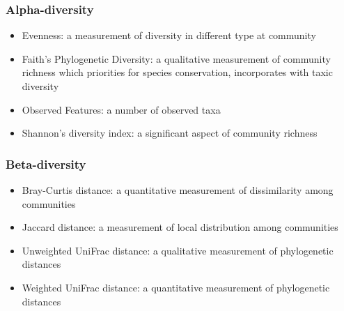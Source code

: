 \documentclass{beamer}
\begin{document}
    \begin{frame}
        \frametitle{Alpha-diversity}

        \begin{itemize}
            \item Evenness: a measurement of diversity in different type at community \cite{evenness1}
            \item Faith's Phylogenetic Diversity: a qualitative measurement of community richness which priorities for species conservation, incorporates with taxic diversity \cite{faith1}
            \item Observed Features: a number of observed taxa
            \item Shannon's diversity index: a significant aspect of community richness \cite{shannon1}
        \end{itemize}
    \end{frame}

    \begin{frame}
        \frametitle{Beta-diversity}

        \begin{itemize}
            \item Bray-Curtis distance: a quantitative measurement of dissimilarity among communities \cite{bray1}
            \item Jaccard distance: a measurement of local distribution among communities \cite{jaccard1}
            \item Unweighted UniFrac distance: a qualitative measurement of phylogenetic distances \cite{unifrac1}
            \item Weighted UniFrac distance: a quantitative measurement of phylogenetic distances \cite{unifrac1}
        \end{itemize}
    \end{frame}
\end{document}
